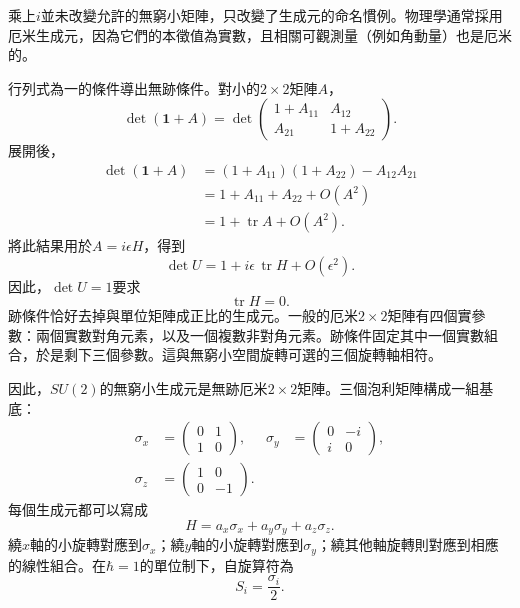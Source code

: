 乘上\(i\)並未改變允許的無窮小矩陣，只改變了生成元的命名慣例。物理學通常採用厄米生成元，因為它們的本徵值為實數，且相關可觀測量（例如角動量）也是厄米的。

行列式為一的條件導出無跡條件。對小的\(2\times2\)矩陣\(A\)，
\begin{equation}
\det(\boldsymbol 1+A)
=
\det
\begin{pmatrix}
1+A_{11}&A_{12}\\
A_{21}&1+A_{22}
\end{pmatrix}.
\end{equation}
展開後，
\begin{align}
\det(\boldsymbol 1+A)
 &=(1+A_{11})(1+A_{22})-A_{12}A_{21}\\
 &=1+A_{11}+A_{22}+O(A^2)\\
 &=1+\operatorname{tr}A+O(A^2).
\end{align}
將此結果用於\(A=i\epsilon H\)，得到
\begin{equation}
\det U=1+i\epsilon\,\operatorname{tr}H+O(\epsilon^2).
\end{equation}
因此，\(\det U=1\)要求
\begin{equation}
\operatorname{tr}H=0.
\end{equation}
跡條件恰好去掉與單位矩陣成正比的生成元。一般的厄米\(2\times2\)矩陣有四個實參數：兩個實數對角元素，以及一個複數非對角元素。跡條件固定其中一個實數組合，於是剩下三個參數。這與無窮小空間旋轉可選的三個旋轉軸相符。

因此，\(SU(2)\)的無窮小生成元是無跡厄米\(2\times2\)矩陣。三個泡利矩陣構成一組基底：
\begin{equation}
\begin{aligned}
\sigma_x&=
\begin{pmatrix}0&1\\1&0\end{pmatrix},
&
\sigma_y&=
\begin{pmatrix}0&-i\\i&0\end{pmatrix},
\\[0.4em]
\sigma_z&=
\begin{pmatrix}1&0\\0&-1\end{pmatrix}.
\end{aligned}
\end{equation}
每個生成元都可以寫成
\begin{equation}
H=a_x\sigma_x+a_y\sigma_y+a_z\sigma_z.
\end{equation}
繞\(x\)軸的小旋轉對應到\(\sigma_x\)；繞\(y\)軸的小旋轉對應到\(\sigma_y\)；繞其他軸旋轉則對應到相應的線性組合。在\(\hbar=1\)的單位制下，自旋算符為
\begin{equation}
S_i=\frac{\sigma_i}{2}.
\end{equation}

